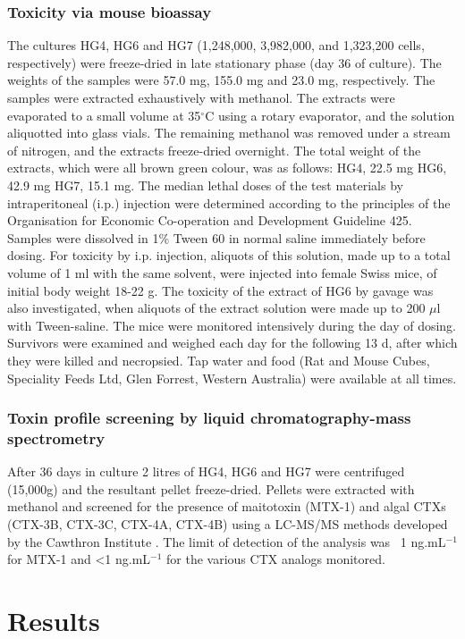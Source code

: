 \documentclass[12pt]{article}
\begin{document}
\subsubsection{Toxicity via mouse bioassay}
The cultures HG4, HG6 and HG7 (1,248,000, 3,982,000, and 1,323,200 cells, respectively) were freeze-dried in late stationary phase (day 36 of culture). 
The weights of the samples were 57.0 mg, 155.0 mg and 23.0 mg, respectively. 
The samples were extracted exhaustively with methanol. 
The extracts were evaporated to a small volume at 35$^{\circ}$C using a rotary evaporator, and the solution aliquotted into glass vials. 
The remaining methanol was removed under a stream of nitrogen, and the extracts freeze-dried overnight. 
The total weight of the extracts, which were all brown green colour, was as follows: HG4, 22.5 mg HG6, 42.9 mg HG7, 15.1 mg. 
The median lethal doses of the test materials by intraperitoneal (i.p.) injection were determined according to the principles of the Organisation for Economic Co-operation and Development Guideline 425. 
Samples were dissolved in 1\% Tween 60 in normal saline immediately before dosing. 
For toxicity by i.p. injection, aliquots of this solution, made up to a total volume of 1 ml with the same solvent, were injected into female Swiss mice, of initial body weight 18-22 g. 
The toxicity of the extract of HG6 by gavage was also investigated, when aliquots of the extract solution were made up to 200 $\mu$l with Tween-saline. 
The mice were monitored intensively during the day of dosing. 
Survivors were examined and weighed each day for the following 13 d, after which they were killed and necropsied. 
Tap water and food (Rat and Mouse Cubes, Speciality Feeds Ltd, Glen Forrest, Western Australia) were available at all times.\\

\subsubsection{Toxin profile screening by liquid chromatography-mass spectrometry}
After 36 days in culture 2 litres of HG4, HG6 and HG7 were centrifuged (15,000g) and the resultant pellet freeze-dried. 
Pellets were extracted with methanol and screened for the presence of maitotoxin (MTX-1) and algal CTXs (CTX-3B, CTX-3C, CTX-4A, CTX-4B) using a LC-MS/MS methods developed by the Cawthron Institute \citep{kohli2014feeding}.
The limit of detection of the analysis was ~1 ng.mL$^{-1}$ for MTX-1 and <1 ng.mL$^{-1}$ for the various CTX analogs monitored.
\newpage
\section{Results}
\end{document}
